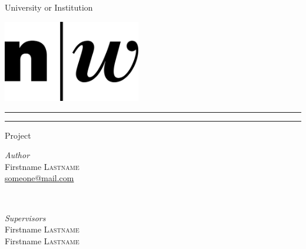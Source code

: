 \begin{titlepage}

\centering

\LARGE{University or Institution}


\vspace*{2cm}


\includegraphics[width=6cm]{figures/logo.png}

\vspace*{2cm}



\rule{\linewidth}{0.1mm}\vspace*{0.5\baselineskip}

\LARGE{\@title}

\rule{\linewidth}{0.1mm}\vspace*{0.5\baselineskip}



\vspace{3cm}
\LARGE{Project\\\@date}
\vspace{5cm}



\begin{minipage}[t]{0.4\textwidth}
    \begin{flushleft}
        \large
        \textit{Author}\\
        Firstname \textsc{Lastname}\\
        {\href{mailto:someone@mail.com}{someone@mail.com}}
    \end{flushleft}
\end{minipage}
~
\begin{minipage}[t]{0.4\textwidth}
    \begin{flushright}
        \large
        \textit{Supervisors}\\
        Firstname \textsc{Lastname}\\
        Firstname \textsc{Lastname}
    \end{flushright}
\end{minipage}

\end{titlepage}


